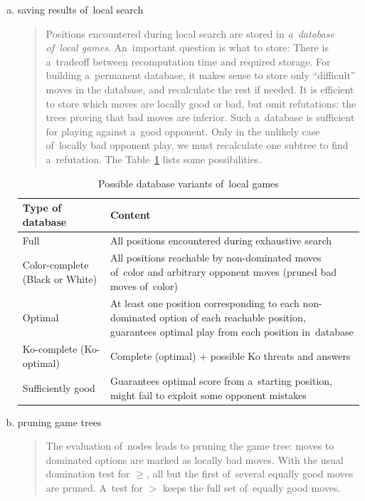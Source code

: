 \begin{enumerate}[(a)]
  \item saving results of~local search
    \begin{quotation} \noindent
      Positions encountered during local search are stored in \emph{a~database of~local games}.
      An~important question is what to store:
      There is a~tradeoff between recomputation time and required storage.
      For building a~permanent database, it makes sense to store only ``difficult'' moves in the database, and recalculate the rest if needed.
      It is efficient to store which moves are locally good or bad, but omit refutations:
      the trees proving that bad moves are inferior.
      Such a~database is sufficient for playing against a~good opponent.
      Only in the unlikely case of~locally bad opponent play, we must recalculate one subtree to find a~refutation.
      The Table~\ref{tab:db-loc-games} lists some possibilities.
    \end{quotation}
    \begin{table}[!htbp]
      \centering
      \begin{tabular}{ |p{}|p{}| } 
        \hline
        \textbf{Type of database} & \textbf{Content} \\
        \hline
        Full                            & All positions encountered during exhaustive search \\
        Color-complete (Black or White) & All positions reachable by non-dominated moves of~color and arbitrary opponent moves (pruned bad moves of~color) \\
        Optimal                         & At least one position corresponding to each non-dominated option of each reachable position, guarantees optimal play from each position in~database \\
        Ko-complete (Ko-optimal)        & Complete (optimal) + possible Ko threats and answers \\
        Sufficiently good               & Guarantees optimal score from a~starting position, might fail to exploit some opponent mistakes \\
        \hline
      \end{tabular}
      \caption{Possible database variants of~local games}
      \label{tab:db-loc-games}
    \end{table}

  \item pruning game trees 
    \begin{quotation} \noindent
      The evaluation of~nodes leads to pruning the game tree:
      moves to dominated options are marked as locally bad moves.
      With the usual domination test for $\geq$, all but the first of~several equally good moves are pruned.
      A~test for $>$ keeps the full set of~equally good moves.
    \end{quotation}


\end{enumerate}
